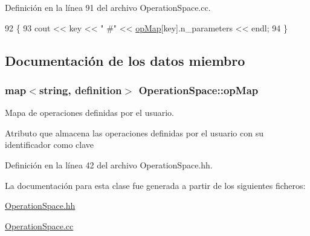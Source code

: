 Definición en la línea 91 del archivo Operation\+Space.\+cc.


\begin{DoxyCode}
92 \{
93   cout << key << \textcolor{stringliteral}{" #"} << \hyperlink{class_operation_space_aae64cd370655d6b2fb3f2305c5a520a7}{opMap}[key].n\_parameters << endl;
94 \}\end{DoxyCode}


\subsection{Documentación de los datos miembro}
\subsubsection[{\texorpdfstring{op\+Map}{opMap}}]{\setlength{\rightskip}{0pt plus 5cm}map$<$string, {\bf definition}$>$ Operation\+Space\+::op\+Map\hspace{0.3cm}{\ttfamily [private]}}\hypertarget{class_operation_space_aae64cd370655d6b2fb3f2305c5a520a7}{}\label{class_operation_space_aae64cd370655d6b2fb3f2305c5a520a7}


Mapa de operaciones definidas por el usuario. 

Atributo que almacena las operaciones definidas por el usuario con su identificador como clave 

Definición en la línea 42 del archivo Operation\+Space.\+hh.



La documentación para esta clase fue generada a partir de los siguientes ficheros\+:\begin{DoxyCompactItemize}
\item 
\hyperlink{_operation_space_8hh}{Operation\+Space.\+hh}\item 
\hyperlink{_operation_space_8cc}{Operation\+Space.\+cc}\end{DoxyCompactItemize}
